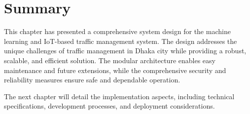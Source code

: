 \section{Summary}

This chapter has presented a comprehensive system design for the machine learning and IoT-based traffic management system. The design addresses the unique challenges of traffic management in Dhaka city while providing a robust, scalable, and efficient solution. The modular architecture enables easy maintenance and future extensions, while the comprehensive security and reliability measures ensure safe and dependable operation.

The next chapter will detail the implementation aspects, including technical specifications, development processes, and deployment considerations. 